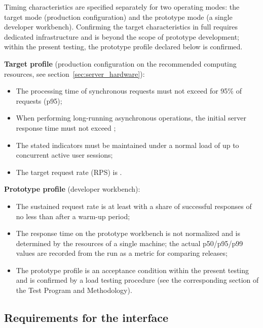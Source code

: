 \documentclass[12pt,a4paper]{extarticle}
\begin{document}
\begin{hseExample}
Timing characteristics are specified separately for two operating modes: the target mode (production configuration) and the prototype mode (a single developer workbench). Confirming the target characteristics in full requires dedicated infrastructure and is beyond the scope of prototype development; within the present testing, the prototype profile declared below is confirmed.

\textbf{Target profile} (production configuration on the recommended computing resources, see section~\ref{sec:server_hardware}):
\begin{itemize}[leftmargin=1.25cm]
    \item The processing time of synchronous requests must not exceed  for 95\% of requests (p95);
    \item When performing long-running asynchronous operations, the initial server response time must not exceed ;
    \item The stated indicators must be maintained under a normal load of up to~ concurrent active user sessions;
    \item The target request rate (RPS) is .
\end{itemize}

\textbf{Prototype profile} (developer workbench):
\begin{itemize}[leftmargin=1.25cm]
    \item The sustained request rate is at least  with a share of successful responses of no less than  after a warm-up period;
    \item The response time on the prototype workbench is not normalized and is determined by the resources of a single machine; the actual p50/p95/p99 values are recorded from the run as a metric for comparing releases;
    \item The prototype profile is an acceptance condition within the present testing and is confirmed by a load testing procedure (see the corresponding section of the Test Program and Methodology).
\end{itemize}
\end{hseExample}

\subsection{Requirements for the interface}
\label{sec:interface_reqs}
\end{document}
